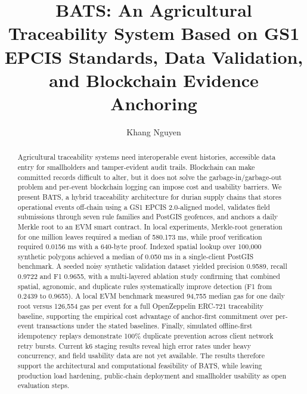 \documentclass[runningheads]{llncs}
\begin{document}
\title{BATS: An Agricultural Traceability System Based on GS1 EPCIS Standards, Data Validation, and Blockchain Evidence Anchoring}

\author{Khang Nguyen}

\maketitle

\begin{abstract}
Agricultural traceability systems need interoperable event histories, accessible data entry for smallholders and tamper-evident audit trails. Blockchain can make committed records difficult to alter, but it does not solve the garbage-in/garbage-out problem and per-event blockchain logging can impose cost and usability barriers. We present BATS, a hybrid traceability architecture for durian supply chains that stores operational events off-chain using a GS1 EPCIS 2.0-aligned model, validates field submissions through seven rule families and PostGIS geofences, and anchors a daily Merkle root to an EVM smart contract. In local experiments, Merkle-root generation for one million leaves required a median of 580.173 ms, while proof verification required 0.0156 ms with a 640-byte proof. Indexed spatial lookup over 100,000 synthetic polygons achieved a median of 0.050 ms in a single-client PostGIS benchmark. A seeded noisy synthetic validation dataset yielded precision 0.9589, recall 0.9722 and F1 0.9655, with a multi-layered ablation study confirming that combined spatial, agronomic, and duplicate rules systematically improve detection (F1 from 0.2439 to 0.9655). A local EVM benchmark measured 94,755 median gas for one daily root versus 126,554 gas per event for a full OpenZeppelin ERC-721 traceability baseline, supporting the empirical cost advantage of anchor-first commitment over per-event transactions under the stated baselines. Finally, simulated offline-first idempotency replays demonstrate 100\% duplicate prevention across client network retry bursts. Current k6 staging results reveal high error rates under heavy concurrency, and field usability data are not yet available. The results therefore support the architectural and computational feasibility of BATS, while leaving production load hardening, public-chain deployment and smallholder usability as open evaluation steps.

\end{abstract}
\end{document}
